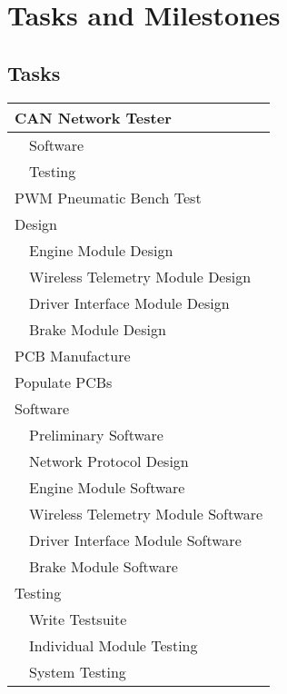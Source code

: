 %
%
%
%

\section{Tasks and Milestones}

\subsection{Tasks}

\begin{center}
  \begin{tabular}{|l|l|}
  \hline 
  \multicolumn{2}{|l|}{CAN Network Tester}\\
  \hline 
  & Software\\
  \hline 
  & Testing\\
  \hline 
  \multicolumn{2}{|l|}{PWM Pneumatic Bench Test}\\
  \hline 
  \multicolumn{2}{|l|}{Design}\\
  \hline 
  & Engine Module Design\\
  \hline 
  & Wireless Telemetry Module Design\\
  \hline 
  & Driver Interface Module Design\\
  \hline 
  & Brake Module Design\\
  \hline 
  \multicolumn{2}{|l|}{PCB Manufacture}\\
  \hline 
  \multicolumn{2}{|l|}{Populate PCBs}\\
  \hline 
  \multicolumn{2}{|l|}{Software}\\
  \hline 
  & Preliminary Software\\
  \hline 
  & Network Protocol Design\\
  \hline 
  & Engine Module Software\\
  \hline 
  & Wireless Telemetry Module Software\\
  \hline 
  & Driver Interface Module Software\\
  \hline 
  & Brake Module Software\\
  \hline 
  \multicolumn{2}{|l|}{Testing}\\
  \hline 
  & Write Testsuite\\
  \hline 
  & Individual Module Testing\\
  \hline 
  & System Testing\\
  \hline
  \end{tabular}
\end{center}

